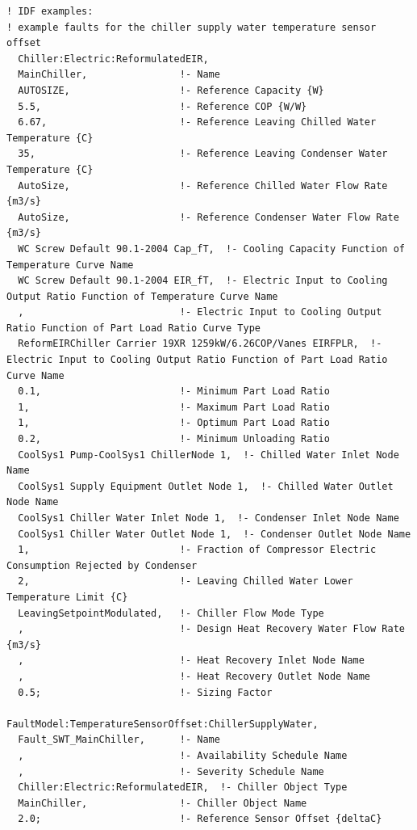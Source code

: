 \begin{lstlisting}
! IDF examples:
! example faults for the chiller supply water temperature sensor offset
  Chiller:Electric:ReformulatedEIR,
  MainChiller,                !- Name
  AUTOSIZE,                   !- Reference Capacity {W}
  5.5,                        !- Reference COP {W/W}
  6.67,                       !- Reference Leaving Chilled Water Temperature {C}
  35,                         !- Reference Leaving Condenser Water Temperature {C}
  AutoSize,                   !- Reference Chilled Water Flow Rate {m3/s}
  AutoSize,                   !- Reference Condenser Water Flow Rate {m3/s}
  WC Screw Default 90.1-2004 Cap_fT,  !- Cooling Capacity Function of Temperature Curve Name
  WC Screw Default 90.1-2004 EIR_fT,  !- Electric Input to Cooling Output Ratio Function of Temperature Curve Name
  ,                           !- Electric Input to Cooling Output Ratio Function of Part Load Ratio Curve Type
  ReformEIRChiller Carrier 19XR 1259kW/6.26COP/Vanes EIRFPLR,  !- Electric Input to Cooling Output Ratio Function of Part Load Ratio Curve Name
  0.1,                        !- Minimum Part Load Ratio
  1,                          !- Maximum Part Load Ratio
  1,                          !- Optimum Part Load Ratio
  0.2,                        !- Minimum Unloading Ratio
  CoolSys1 Pump-CoolSys1 ChillerNode 1,  !- Chilled Water Inlet Node Name
  CoolSys1 Supply Equipment Outlet Node 1,  !- Chilled Water Outlet Node Name
  CoolSys1 Chiller Water Inlet Node 1,  !- Condenser Inlet Node Name
  CoolSys1 Chiller Water Outlet Node 1,  !- Condenser Outlet Node Name
  1,                          !- Fraction of Compressor Electric Consumption Rejected by Condenser
  2,                          !- Leaving Chilled Water Lower Temperature Limit {C}
  LeavingSetpointModulated,   !- Chiller Flow Mode Type
  ,                           !- Design Heat Recovery Water Flow Rate {m3/s}
  ,                           !- Heat Recovery Inlet Node Name
  ,                           !- Heat Recovery Outlet Node Name
  0.5;                        !- Sizing Factor

FaultModel:TemperatureSensorOffset:ChillerSupplyWater,
  Fault_SWT_MainChiller,      !- Name
  ,                           !- Availability Schedule Name
  ,                           !- Severity Schedule Name
  Chiller:Electric:ReformulatedEIR,  !- Chiller Object Type
  MainChiller,                !- Chiller Object Name
  2.0;                        !- Reference Sensor Offset {deltaC}
\end{lstlisting}


